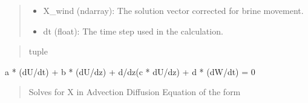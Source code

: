 \documentclass[a4paper,11pt,english,openany]{sphinxmanual}
\begin{document}
\begin{fulllineitems}
\begin{fulllineitems}
\begin{quote}
\begin{description}
\begin{itemize}
\item {} 
\sphinxAtStartPar
X\_wind (ndarray): The solution vector corrected for brine movement.

\item {} 
\sphinxAtStartPar
dt (float): The time step used in the calculation.

\end{itemize}

\end{description}
\end{quote}
\begin{quote}\begin{description}
\sphinxAtStartPar
tuple

\end{description}\end{quote}

\end{fulllineitems}


\begin{fulllineitems}
\label{\detokenize{api/spyice.models.advection_diffusion:src.spyice.models.advection_diffusion.AdvectionDiffusion.voller_X_array_set_zero_to_melt}}
\pysigstartsignatures
\pysiglinewithargsret
{}
{\sphinxparamcomma {}}
{}
\pysigstopsignatures
\end{fulllineitems}


\end{fulllineitems}


\begin{fulllineitems}
\label{\detokenize{api/spyice.models.advection_diffusion:src.spyice.models.advection_diffusion.top_temp}}
\pysigstartsignatures
\pysigline
{}
\pysigstopsignatures
\sphinxAtStartPar
a * (dU/dt) +  b * (dU/dz) + d/dz(c * dU/dz) + d * (dW/dt) = 0
\begin{quote}\begin{description}
\sphinxAtStartPar
Solves for X in Advection\sphinxhyphen{} Diffusion\sphinxhyphen{} Equation of the form

\end{description}\end{quote}

\end{fulllineitems}
\end{document}

